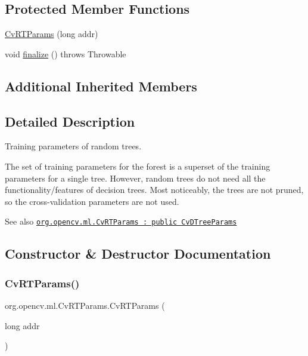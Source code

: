 \subsection*{Protected Member Functions}
\begin{DoxyCompactItemize}
\item 
\mbox{\hyperlink{classorg_1_1opencv_1_1ml_1_1_cv_r_t_params_ab8a0ff0cf1430b6cc852622746a3788f}{Cv\+R\+T\+Params}} (long addr)
\item 
void \mbox{\hyperlink{classorg_1_1opencv_1_1ml_1_1_cv_r_t_params_aac1294c1848d09e370545fa7e80f71fc}{finalize}} ()  throws Throwable 
\end{DoxyCompactItemize}
\subsection*{Additional Inherited Members}


\subsection{Detailed Description}
Training parameters of random trees.

The set of training parameters for the forest is a superset of the training parameters for a single tree. However, random trees do not need all the functionality/features of decision trees. Most noticeably, the trees are not pruned, so the cross-\/validation parameters are not used.

\begin{DoxySeeAlso}{See also}
\href{http://docs.opencv.org/modules/ml/doc/random_trees.html#cvrtparams}{\tt org.\+opencv.\+ml.\+Cv\+R\+T\+Params \+: public Cv\+D\+Tree\+Params} 
\end{DoxySeeAlso}


\subsection{Constructor \& Destructor Documentation}
\mbox{\label{classorg_1_1opencv_1_1ml_1_1_cv_r_t_params_ab8a0ff0cf1430b6cc852622746a3788f}} 
\subsubsection{\texorpdfstring{Cv\+R\+T\+Params()}{CvRTParams()}\hspace{0.1cm}{\footnotesize\ttfamily [1/2]}}
{\footnotesize\ttfamily org.\+opencv.\+ml.\+Cv\+R\+T\+Params.\+Cv\+R\+T\+Params (\begin{DoxyParamCaption}\item[{long}]{addr }\end{DoxyParamCaption})\hspace{0.3cm}{\ttfamily [protected]}}

